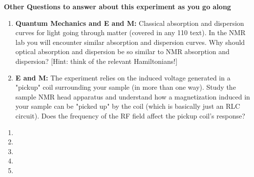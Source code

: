 \documentclass{../signatures}
\begin{document}

\textbf{Other Questions to answer about this experiment as you go along}

\begin{enumerate}

    \item \textbf{Quantum Mechanics and E and M:} Classical absorption and dispersion curves for light going through matter (covered in any 110 text). In the NMR lab you will encounter similar absorption and dispersion curves. Why should optical absorption and dispersion be so similar to NMR absorption and dispersion? [Hint: think of the relevant Hamiltonians!]

    \item \textbf{E and M:} The experiment relies on the induced voltage generated in a "pickup" coil surrounding your sample (in more than one way). Study the sample NMR head apparatus and understand how a magnetization induced in your sample can be "picked up" by the coil (which is basically just an RLC circuit). Does the frequency of the RF field affect the pickup coil's response?
    \\[24pt]

\end{enumerate}

\pagebreak

\checkpointsection 

\begin{enumerate}

\item {}

\item {}

\item {}

\item {}

\item {}

\end{enumerate}
\end{document}
